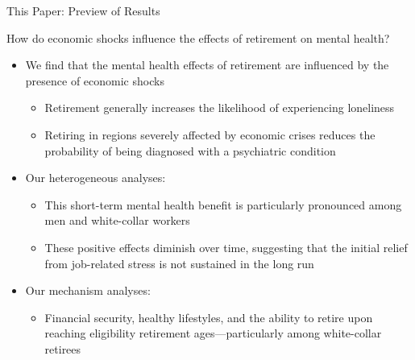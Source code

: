 \documentclass{beamer}
\begin{document}
\begin{frame}{This Paper: Preview of Results}

\footnotesize
\begin{block}{}
\centering
How do economic shocks influence the effects of retirement on mental health?
\end{block}

\begin{itemize}

  \item<2-> We find  that the \begingroup\color{Blue}mental \endgroup health effects of \begingroup\color{Blue}retirement  \endgroup are influenced by the presence of \begingroup\color{Blue}economic shocks  \endgroup
\begin{itemize}
\scriptsize
\item<3-> \begingroup\color{Blue}Retirement  \endgroup generally increases the likelihood of experiencing \begingroup\color{Blue}loneliness \endgroup

\item<4-> Retiring in \begingroup\color{Blue}regions severely affected by economic crises  \endgroup reduces the probability of being diagnosed with a \begingroup\color{Blue}psychiatric condition  \endgroup
\end{itemize}

 \item<5-> Our \begingroup\color{Blue}heterogeneous \endgroup analyses: 
 \begin{itemize}
\scriptsize
\item<6-> This \begingroup\color{Blue}short-term  \endgroup mental health benefit is particularly pronounced among \begingroup\color{Blue}men  \endgroup and \begingroup\color{Blue}white-collar workers  \endgroup 
\item<7-> These positive effects \begingroup\color{Blue}diminish over time\endgroup, suggesting that the initial relief from job-related stress is not sustained in the long run


\end{itemize}

 \item<8-> Our \begingroup\color{Blue}mechanism \endgroup analyses: 
 \begin{itemize}
\scriptsize
\item<9-> \begingroup\color{Blue}Financial security\endgroup, \begingroup\color{Blue}healthy lifestyles\endgroup, and the \begingroup\color{Blue}ability \endgroup to retire upon reaching eligibility retirement ages—particularly among white-collar retirees


\end{itemize}
\end{itemize}

\end{frame}
\end{document}
